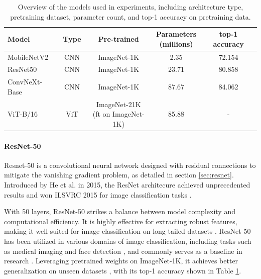 \begin{table}[ht]
    \centering
    \caption{Overview of the models used in experiments, including architecture type, pretraining dataset, parameter count, and top-1 accuracy on pretraining data.}
    \small
    \begin{tabular}{lcccc}
    \toprule
    \textbf{Model} & \textbf{Type} & \textbf{Pre-trained} & \makecell{\textbf{Parameters} \\ \textbf{(millions)}} & \textbf{top-1 accuracy} \\
    \midrule
    MobileNetV2 \cite{sandler2018mobilenetv2} & CNN  & ImageNet-1K & 2.35 & 72.154 \cite{pytorch_mobilenetv2} \\
    ResNet50 \cite{he2015deepresiduallearningimage} & CNN & ImageNet-1K & 23.71 & 	
    80.858 \cite{pytorchresnet} \\
    ConvNeXt-Base \cite{pytorch-convnext}  & CNN & ImageNet-1K & 87.67 & 84.062 \cite{torchvision-resnet} \\
    ViT-B/16 \cite{dosovitskiy2021imageworth16x16words}   & ViT & \makecell{ImageNet-21K \\ (ft on ImageNet-1K)} & 85.88 & 	- \\
    \bottomrule
    \end{tabular}
    \label{tab:model_performance}
\end{table}



\paragraph{ResNet-50}
Resnet-50 \cite{he2015deepresiduallearningimage} is a convolutional neural network designed with residual connections to mitigate the vanishing gradient problem, as detailed in section \ref{sec:resnet}. Introduced by He et al. in 2015, the ResNet architecure achieved unprecedented results and won ILSVRC 2015 for image classification tasks \cite{ILSVRC15}. 

With 50 layers, ResNet-50 strikes a balance between model complexity and computational efficiency. It is highly effective for extracting robust features, making it well-suited for image classification on long-tailed datasets \cite{he2015deepresiduallearningimage}. ResNet-50 has been utilized in various domains of image classification, including tasks such as medical imaging \cite{huang2022identifyingkeycomponentsresnet50, Simegn} and face detection \cite{Nyarko2022}, and commonly serves as a baseline in research \cite{yun2019cutmixregularizationstrategytrain,cubuk2019randaugmentpracticalautomateddata,zhang2018mixupempiricalriskminimization,menon2021longtaillearninglogitadjustment}. Leveraging pretrained weights on ImageNet-1K, it achieves better generalization on unseen datasets \cite{resnettransfer,RAZAVI2024123276,chan2019transfer,Shafiq2022}, with its top-1 accuracy shown in Table \ref{tab:model_performance}. 

